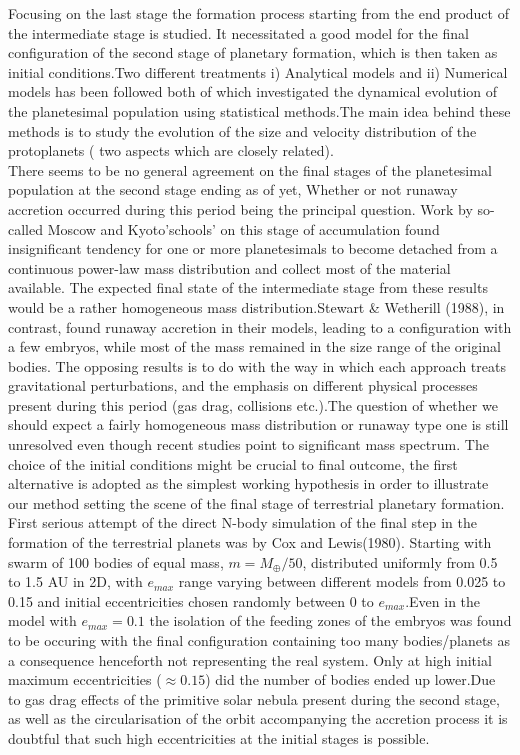 Focusing  on the  last stage the formation process starting from the end product of the intermediate stage is studied. It necessitated a good model for the final configuration of the second stage of planetary formation, which is then taken as initial conditions.Two different treatments i) Analytical models and ii) Numerical models has been followed both of which investigated the dynamical evolution of the planetesimal population using statistical methods.The main idea behind these methods is to study the evolution of the size and velocity distribution of the protoplanets ( two aspects which are closely related).\\


There seems to be no general agreement on the final stages of the planetesimal population at the second stage ending as of yet, Whether or not runaway accretion occurred during this period being the principal question. Work by so-called Moscow and Kyoto'schools' on this stage of accumulation found insignificant tendency for one or more planetesimals to become detached from a  continuous power-law mass distribution and collect most of the material available. The expected final state of the intermediate stage from these results would be a rather homogeneous mass distribution.Stewart \& Wetherill (1988), in contrast, found runaway accretion in their models, leading to a configuration with a few embryos, while most of the mass remained in the size range of the original bodies.
The opposing results is to do with the way in which each approach treats gravitational perturbations, and the emphasis on different physical processes present during this period (gas drag, collisions etc.).The question of whether we should expect a fairly homogeneous mass distribution or  runaway type one is still unresolved even though recent studies point to significant mass spectrum. The choice of the initial conditions might be crucial to final outcome, the first alternative is adopted as the simplest working hypothesis in order to illustrate our method setting the scene of the final stage of terrestrial planetary formation.\\

First serious attempt of the direct N-body simulation of the final step in the formation of the terrestrial planets was by Cox and Lewis(1980). Starting with swarm of 100 bodies of equal mass, $m = M_{\oplus}/50$, distributed uniformly from 0.5 to 1.5  AU in 2D, with $e_{max}$ range varying between different models from 0.025 to 0.15 and initial eccentricities chosen randomly between $0$ to $e_{max}$.Even in the model with  $e_{max} = 0.1$ the isolation of the feeding zones of the embryos was found to be occuring with the final configuration containing too many bodies/planets as a consequence henceforth not representing the real system. Only at high initial maximum eccentricities ($\approx 0.15$) did the number of bodies ended up lower.Due to  gas drag effects of the primitive solar nebula present during the second stage, as well as the circularisation of the orbit accompanying the accretion process it is doubtful that such high eccentricities at the initial stages is possible.

